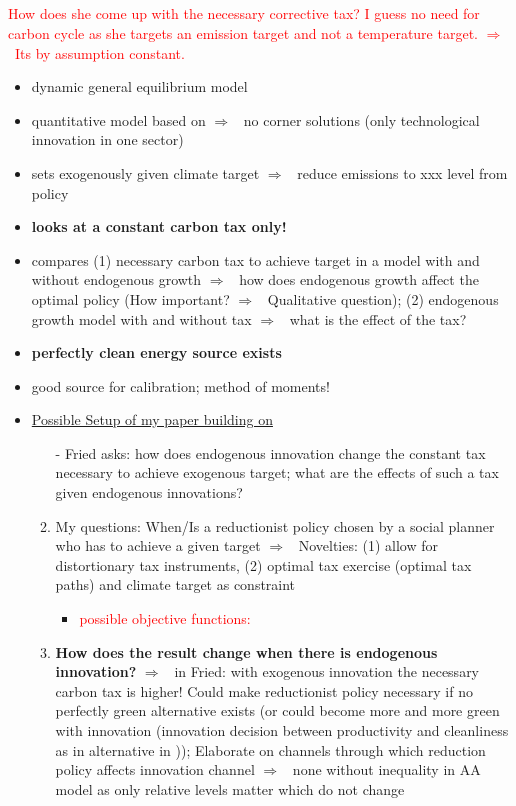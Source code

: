 \documentclass[12pt]{article}
\newcommand{\ar}{$\Rightarrow$ \ }
\newcommand{\tr}[1]{\textcolor{red}{#1}}
\begin{document}
\subsection{\cite{Fried2018ClimateAnalysis}} \tr{How does she come up with the necessary corrective tax? I guess no need for carbon cycle as she targets an emission target and not a temperature target. \ar Its by assumption constant. }
\begin{itemize}
	\item dynamic general equilibrium model
	\item quantitative model based on \cite{Acemoglu2012TheChange} \ar no corner solutions (only technological innovation in one sector)
	\item sets exogenously given climate target \ar reduce emissions to xxx level from policy
	\item \textbf{looks at a constant carbon tax only!}
	\item compares (1) necessary carbon tax to achieve target in a model with and without endogenous growth \ar how does endogenous growth affect the optimal policy (How important? \ar Qualitative question); (2) endogenous growth model with and without tax \ar what is the effect of the tax?
	\item \textbf{perfectly clean energy source exists}
	\item good source for calibration; method of moments!
	\item \underline{Possible Setup of my paper building on \cite{Fried2018ClimateAnalysis}} 
	\begin{enumerate}
		\item[-] Fried asks: how does endogenous innovation change the constant tax necessary to achieve exogenous target; what are the effects of such a tax given endogenous innovations?
		\item My questions: When/Is a reductionist policy chosen by a social planner who has to achieve a given target \ar Novelties: (1) allow for distortionary tax instruments, (2) optimal tax exercise (optimal tax paths) and climate target as constraint 
		\begin{itemize}
\item \tr{possible objective functions: }
		\end{itemize}
		\item \textbf{How does the result change when there is endogenous innovation?} \ar in Fried: with exogenous innovation the necessary carbon tax is higher! Could make reductionist policy necessary if no perfectly green alternative exists (or could become more and more green with innovation (innovation decision between productivity and cleanliness as in alternative in \cite{Acemoglu2012TheChange})); Elaborate on channels through which reduction policy affects innovation channel \ar none without inequality in AA model as only relative levels matter which do not change

\end{enumerate}
\end{itemize}
\end{document}
